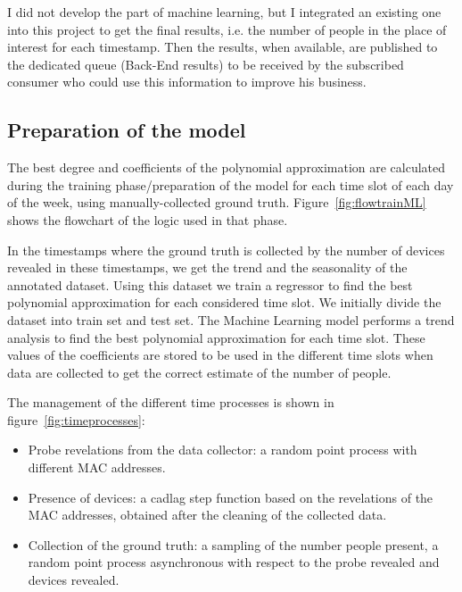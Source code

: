 I did not develop the part of machine learning, but I integrated an existing one into this project to get the final results, i.e. the number of people in the place of interest for each timestamp. Then the results, when available, are published to the dedicated queue (Back-End results) to be received by the subscribed consumer who could use this information to improve his business.


\subsection{Preparation of the model}
\label{sec:model}
\vspace{0.2 cm} 

The best degree and coefficients of the polynomial approximation are calculated during the training phase/preparation of the model for each time slot of each day of the week, using manually-collected ground truth. Figure~\ref{fig:flowtrainML} shows the flowchart of the logic used in that phase.

In the timestamps where the ground truth is collected by the number of devices revealed in these timestamps, we get the trend and the seasonality of the annotated dataset.
Using this dataset we train a regressor to find the best polynomial approximation for each considered time slot. We initially divide the dataset into train set and test set. The Machine Learning model performs a trend analysis to find the best polynomial approximation for each time slot. These values of the coefficients are stored to be used in the different time slots when data are collected to get the correct estimate of the number of people.

The management of the different time processes is shown in figure~\ref{fig:timeprocesses}:
\begin{itemize}
  \item Probe revelations from the data collector: a random point process with different MAC addresses.
  \item Presence of devices: a cadlag step function based on the revelations of the MAC addresses, obtained after the cleaning of the collected data.
  \item Collection of the ground truth: a sampling of the number people present, a random point process asynchronous with respect to the probe revealed and devices revealed.
\end{itemize}

